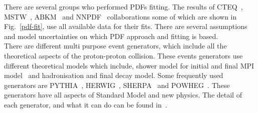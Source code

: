 There are several groups who performed PDFs fitting. The results of CTEQ~\cite{Nadolsky_2008}, MSTW~\cite{Martin_2009}, ABKM~\cite{Alekhin_2010} and NNPDF~\cite{Ball:2011us} collaborations some of which are shown in Fig.~\ref{pdf-fit}, use all available data for their fits. There are several assumptions and model uncertainties on which PDF approach and fitting is based.\\
There are different multi purpose event generators, which include all the theoretical aspects of the proton-proton collision. These events generators use different theoretical models which include, shower model for initial and final MPI model~\cite{Blok_2016} and hadronisation and final decay model. Some frequently used generators are PYTHIA~\cite{Sj_strand_2008}, HERWIG~\cite{Corcella_2001}, SHERPA~\cite{Gleisberg_2009} and POWHEG~\cite{Oleari_2010}. These generators have all aspects of Standard Model and new physics. The detail of each generator, and what it can do can be found in~\cite{Schott_2014}. 

